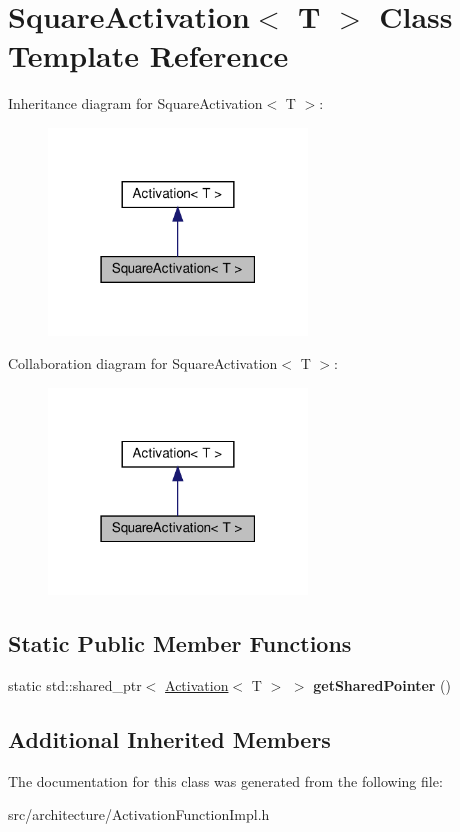 \hypertarget{classSquareActivation}{}\section{Square\+Activation$<$ T $>$ Class Template Reference}
\label{classSquareActivation}


Inheritance diagram for Square\+Activation$<$ T $>$\+:
\nopagebreak
\begin{figure}[H]
\begin{center}
\leavevmode
\includegraphics[width=195pt]{classSquareActivation__inherit__graph}
\end{center}
\end{figure}


Collaboration diagram for Square\+Activation$<$ T $>$\+:
\nopagebreak
\begin{figure}[H]
\begin{center}
\leavevmode
\includegraphics[width=195pt]{classSquareActivation__coll__graph}
\end{center}
\end{figure}
\subsection*{Static Public Member Functions}
\begin{DoxyCompactItemize}
\item 
\mbox{\label{classSquareActivation_ad02c81cc5c1100e5c511ba9fcd566991}} 
static std\+::shared\+\_\+ptr$<$ \hyperlink{classActivation}{Activation}$<$ T $>$ $>$ {\bfseries get\+Shared\+Pointer} ()
\end{DoxyCompactItemize}
\subsection*{Additional Inherited Members}


The documentation for this class was generated from the following file\+:\begin{DoxyCompactItemize}
\item 
src/architecture/Activation\+Function\+Impl.\+h\end{DoxyCompactItemize}

